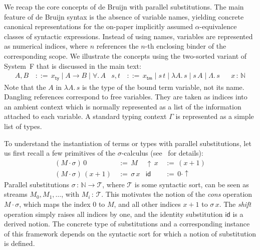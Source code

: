 \documentclass[a4paper,UKenglish]{lipics-v2016}
\newcommand{\ms}{\,}
\newcommand{\mrel}[1]{\mathrel{\ms #1 \ms}}
\newcommand{\Nat}{\mathbb{N}}
\newcommand{\OF}{\mrel{:}}
\newcommand{\bnfdef}{\mrel{::=}}
\newcommand{\eqdef}{\mrel{:=}}
\newcommand{\ty}{\mathsf{ty}}
\newcommand{\tm}{\mathsf{tm}}
\newcommand{\All}{\ensuremath{\forall.\,}}
\newcommand{\Lam}[1]{\ensuremath{\lambda #1.\,}}
\newcommand{\TyLam}{\ensuremath{\Lambda.\,}}
\newcommand{\scons}{\mathbin{\cdot}}
\newcommand{\id}{\mathsf{id}}
\newcommand{\shift}{\ensuremath{\uparrow}}
\theoremstyle{plain}
\begin{document}
We recap the core concepts of de Bruijn with parallel substitutions.
The main feature of de Bruijn syntax is the absence of variable names, yielding concrete canonical representations for the on-paper implicitly assumed $\alpha$-equivalence classes of syntactic expressions.
Instead of using names, variables are represented as numerical indices, where $n$ references the $n$-th enclosing binder of the corresponding scope.
We illustrate the concepts using the two-sorted variant of System~F that is discussed in the main text:
\begin{align*}
  A, B &\bnfdef x_\ty \mid A \to B \mid \All A & s, t &\bnfdef x_\tm \mid s\,t \mid \Lam A s \mid s\,A \mid \TyLam s & &x \OF \Nat
\end{align*}
Note that the $A$ in $\Lam A s$ is the type of the bound term variable, not its name.
Dangling references correspond to free variables.
They are taken as indices into an ambient context which is normally represented as a list of the information attached to each variable.
A standard typing context $\Gamma$ is represented as a simple list of types.

To understand the instantiation of terms or types with parallel substitutions, let us first recall a few primitives of the $\sigma$-calculus (see~\cite{abadi1991} for details):
\begin{align*}
  (M \scons \sigma)\,0 &\eqdef M & \shift\,x&\eqdef (x + 1)\\
  (M \scons \sigma)\,(x + 1) &\eqdef \sigma\,x & \id &\eqdef 0 \scons \shift
\end{align*}
Parallel substitutions $\sigma \OF \Nat \to \mathcal{T}$, where $\mathcal{T}$ is some syntactic sort, can be seen as streams $M_0, M_1, \ldots $, with $M_i \OF \mathcal{T}$.
This motivates the notion of the \emph{cons} operation $M \scons \sigma$, which maps the index 0 to $M$, and all other indices $x + 1$ to $\sigma\,x$.
The \emph{shift} operation simply raises all indices by one, and the identity substitution $\id$ is a derived notion.
The concrete type of substitutions and a corresponding instance of this framework depends on the syntactic sort for which a notion of substitution is defined.
\end{document}
